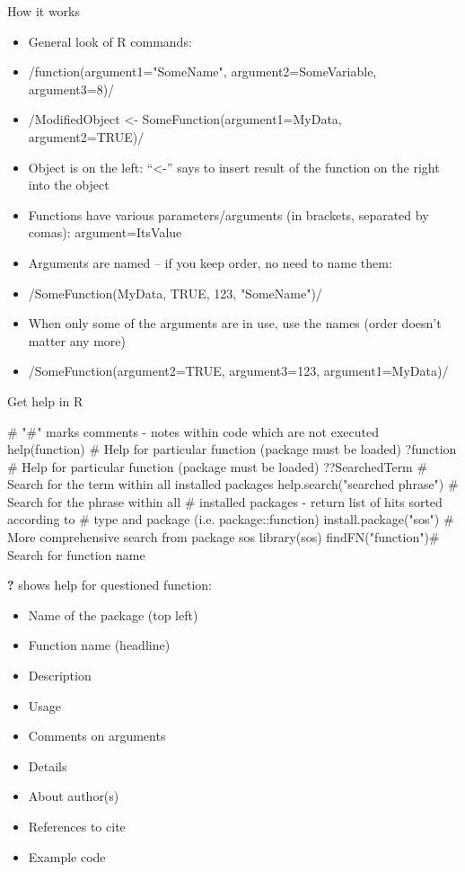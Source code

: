 \documentclass[compress, ucs, xelatex, 11pt, xcolor=svgnames,
  hyperref={
    bookmarks=true,
    unicode=true,
    colorlinks=true,
    pdftitle={Molecular data in R},
    plainpages=false,
    pdfauthor={Vojtech Zeisek},
    pdfsubject={Course about phylogeny and evolution in R},
    pdfcreator={XeLaTeX},
    pdfkeywords={R, evolution, phylogeny, molecular data},
    linkcolor=Tomato,
    anchorcolor=SaddleBrown,
    citecolor=Goldenrod,
    filecolor=DarkMagenta,
    menucolor=Sienna,
    urlcolor=DarkTurquoise,
    pdftex},
  url={hyphens, lowtilde} %
  ]{beamer}
\begin{document}
\begin{frame}{How it works}
\begin{itemize}
 \item General look of R commands:
 \item \splus/function(argument1="SomeName", argument2=SomeVariable, argument3=8)/
 \item \splus/ModifiedObject <- SomeFunction(argument1=MyData, argument2=TRUE)/
 \item Object is on the left: ``<-'' says to insert result of the function on the right into the object
 \item Functions have various parameters/arguments (in brackets, separated by comas): argument=ItsValue
 \item Arguments are named -- if you keep order, no need to name them:
 \item \splus/SomeFunction(MyData, TRUE, 123, "SomeName")/
 \item When only some of the arguments are in use, use the names (order doesn't matter any more)
 \item \splus/SomeFunction(argument2=TRUE, argument3=123, argument1=MyData)/
\end{itemize}
\end{frame}

\begin{frame}[fragile]{Get help in R}
  \begin{spluscode}
    # "#" marks comments - notes within code which are not executed
    help(function) # Help for particular function (package must be loaded)
    ?function # Help for particular function (package must be loaded)
    ??SearchedTerm # Search for the term within all installed packages
    help.search("searched phrase") # Search for the phrase within all
      # installed packages - return list of hits sorted according to
      # type and package (i.e. package::function)
    install.package("sos") # More comprehensive search from package sos
    library(sos)
    findFN("function")# Search for function name
  \end{spluscode}
\alert{\textbf{?}} shows help for questioned function:
\begin{multicols}{2}
  \begin{itemize}
    \item Name of the package (top left)
    \item Function name (headline)
    \item Description
    \item Usage
    \item Comments on arguments
    \item Details
    \item About author(s)
    \item References to cite
    \item Example code
  \end{itemize}
\end{multicols}
\end{frame}
\end{document}
